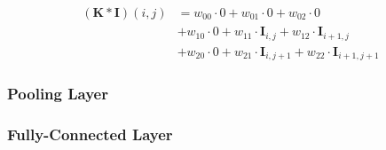 \begin{equation}
    \begin{split}
        (\bm{K} * \bm{I})(i,j) 
        &= w_{00} \cdot 0 + w_{01} \cdot 0 + w_{02} \cdot 0 \\ 
        &+ w_{10} \cdot 0 + w_{11} \cdot \bm{I}_{i,j} + w_{12} \cdot \bm{I}_{i+1,j} \\
        &+ w_{20} \cdot 0 + w_{21} \cdot \bm{I}_{i,j+1} + w_{22} \cdot \bm{I}_{i+1,j+1}
    \end{split}
\end{equation}






\subsubsection{Pooling Layer}

\subsubsection{Fully-Connected Layer}